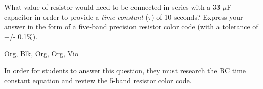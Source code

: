

What value of resistor would need to be connected in series with a 33 $\mu$F capacitor in order to provide a {\it time constant} ($\tau$) of 10 seconds?  Express your answer in the form of a five-band precision resistor color code (with a tolerance of +/- 0.1\%).







Org, Blk, Org, Org, Vio







In order for students to answer this question, they must research the RC time constant equation and review the 5-band resistor color code.




